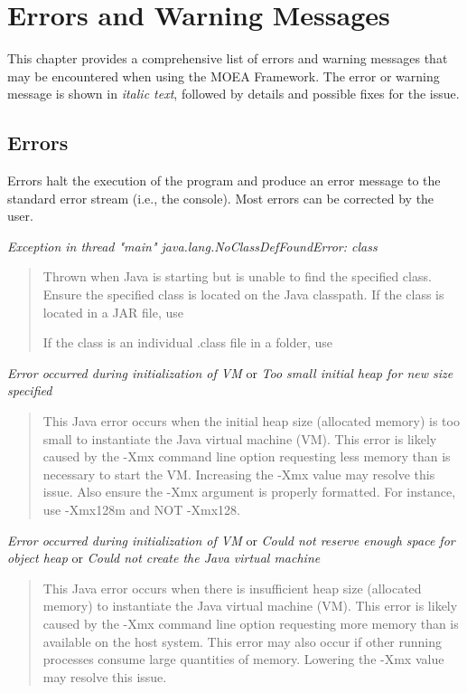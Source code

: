 \chapter{Errors and Warning Messages}

This chapter provides a comprehensive list of errors and warning messages that may be encountered when using the MOEA Framework.  The error or warning message is shown in \textit{italic text}, followed by details and possible fixes for the issue.

\section{Errors}
Errors halt the execution of the program and produce an error message to the standard error stream (i.e., the console).  Most errors can be corrected by the user.
\vspace{\baselineskip}

\noindent
\textit{Exception in thread "main" java.lang.NoClassDefFoundError: \<class\>}
\begin{quote}
  Thrown when Java is starting but is unable to find the specified class. Ensure the specified class is located on the Java classpath.  If the class is located in a JAR file, use
  
    
  If the class is an individual .class file in a folder, use
  
\end{quote}

\noindent
\textit{Error occurred during initialization of VM} or
\textit{Too small initial heap for new size specified}
\begin{quote}
  This Java error occurs when the initial heap size (allocated memory) is too small to instantiate the Java virtual machine (VM).  This error is likely caused by the -Xmx command line option requesting less memory than is necessary to start the VM.  Increasing the -Xmx value may resolve this issue. Also ensure the -Xmx argument is properly formatted.  For instance, use -Xmx128m and NOT -Xmx128.
\end{quote}

\noindent
\textit{Error occurred during initialization of VM} or
\textit{Could not reserve enough space for object heap} or
\textit{Could not create the Java virtual machine}
\begin{quote}
  This Java error occurs when there is insufficient heap size (allocated memory) to instantiate the Java virtual machine (VM).  This error is likely caused by the -Xmx command line option requesting more memory than is available on the host system.  This error may also occur if other running processes consume large quantities of memory.  Lowering the -Xmx value may  resolve this issue.
\end{quote}


